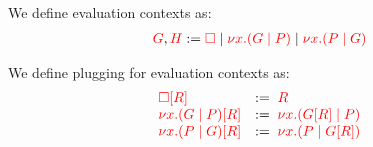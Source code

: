 \begin{definition}\label{def:cp-evaluation-contexts}
  We define evaluation contexts as:
  \begin{align*}
    \textcolor{red}{G}, \textcolor{red}{H} := \textcolor{red}{\Box}
    \mid \textcolor{red}{\nu x.(G \mid P)}
    \mid \textcolor{red}{\nu x.(P \mid G)}
  \end{align*}
\end{definition}
\begin{definition}[Plugging]\label{def:cp-evaluation-context-plugging}
  We define plugging for evaluation contexts as:
  \begin{gather*}
    \begin{array}{ll}
      \textcolor{red}{{\Box}[{R}]}            
      & := \; \textcolor{red}{R}
      \\
      \textcolor{red}{{\nu x.(G \mid P)}[{R}]}
      & := \; \textcolor{red}{\nu x.({G}[{R}] \mid P)}
      \\
      \textcolor{red}{{\nu x.(P \mid G)}[{R}]}
      & := \; \textcolor{red}{\nu x.(P \mid {G}[{R}])}
    \end{array}
  \end{gather*}
\end{definition}
